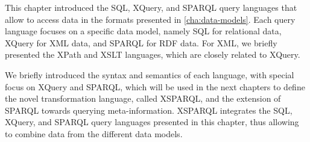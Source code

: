 This chapter introduced the \ac{SQL}, XQuery, and SPARQL query languages that allow to access data in the formats
presented in \cref{cha:data-models}.
%
Each query language focuses on a specific data model, namely \ac{SQL} for relational data, XQuery for \ac{XML} data, and
SPARQL for \ac{RDF} data.  For \ac{XML}, we briefly presented the \ac{XPath} and \ac{XSLT} languages, which are closely
related to XQuery.

We briefly introduced the syntax and semantics of each language, with special focus on XQuery and SPARQL, which will be
used in the next chapters to define the novel transformation language, called XSPARQL, and the extension of SPARQL
towards querying meta-information.
%
XSPARQL integrates the \ac{SQL}, XQuery, and SPARQL query languages presented in this chapter, thus allowing to combine
data from the different data models.


